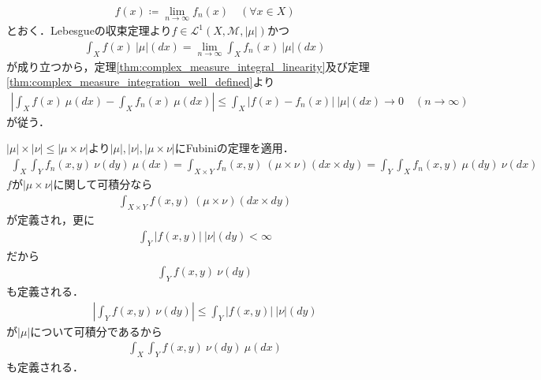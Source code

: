 	\begin{prf}
		\begin{align}
			f(x) \coloneqq \lim_{n \to \infty} f_n(x) \quad (\forall x \in X)
		\end{align}
		とおく．Lebesgueの収束定理より$f \in \mathscr{L}^1(X,\mathcal{M},|\mu|)$かつ
		\begin{align}
			\int_X f(x)\ |\mu|(dx) = \lim_{n \to \infty} \int_X f_n(x)\ |\mu|(dx)
		\end{align}
		が成り立つから，定理\ref{thm:complex_measure_integral_linearity}及び定理\ref{thm:complex_measure_integration_well_defined}より
		\begin{align}
			\left| \int_X f(x)\ \mu(dx) - \int_X f_n(x)\ \mu(dx) \right| \leq \int_X \left| f(x) - f_n(x) \right|\ |\mu|(dx) \longrightarrow 0
			\quad (n \longrightarrow \infty)
		\end{align}
		が従う．
		\QED
	\end{prf}
	
	\begin{screen}
		\begin{thm}[順序交換定理]
		\end{thm}
	\end{screen}
	
	\begin{prf}
		$|\mu| \times |\nu| \leq |\mu \times \nu|$より$|\mu|,|\nu|,|\mu \times \nu|$にFubiniの定理を適用．
		\begin{align}
			\int_X \int_Y f_n(x,y)\ \nu(dy)\ \mu(dx) = \int_{X \times Y} f_n(x,y)\ (\mu \times \nu)(dx \times dy)
			= \int_Y \int_X f_n(x,y)\ \mu(dy)\ \nu(dx)
		\end{align}
		$f$が$|\mu \times \nu|$に関して可積分なら
		\begin{align}
			\int_{X \times Y} f(x,y)\ (\mu \times \nu)(dx \times dy)
		\end{align}
		が定義され，更に
		\begin{align}
			\int_Y |f(x,y)|\ |\nu|(dy) < \infty
		\end{align}
		だから
		\begin{align}
			\int_Y f(x,y)\ \nu(dy)
		\end{align}
		も定義される．
		\begin{align}
			\left| \int_Y f(x,y)\ \nu(dy) \right| \leq \int_Y |f(x,y)|\ |\nu|(dy)
		\end{align}
		が$|\mu|$について可積分であるから
		\begin{align}
			\int_X \int_Y f(x,y)\ \nu(dy)\ \mu(dx)
		\end{align}
		も定義される．
	\end{prf}